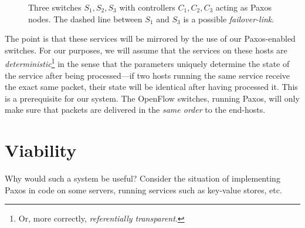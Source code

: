 \begin{figure}[H]
  \centering
  \caption{Three switches $S_1, S_2, S_3$ with controllers $C_1, C_2, C_3$ acting as Paxos nodes.
           The dashed line between $S_1$ and $S_3$ is a possible \textit{failover-link}.}
  \label{figure:graph.three.switches}
\end{figure}

The point is that these services will be mirrored by the use of our
Paxos-enabled switches.  For our purposes, we will assume that the services
on these hosts are \textit{deterministic}\footnote{Or,
more correctly, \textit{referentially transparent}.} in the sense that the parameters uniquely determine the
state of the service after being processed---if two hosts running the
same service receive the exact same packet, their state will be
identical after having processed it.  This is a prerequisite for our
system.  The OpenFlow switches, running Paxos, will only make sure that
packets are delivered in the \textit{same order} to the end-hosts.

\section{Viability}

Why would such a system be useful? Consider the situation of implementing
Paxos in code on some servers, running services such as key-value
stores, etc.

